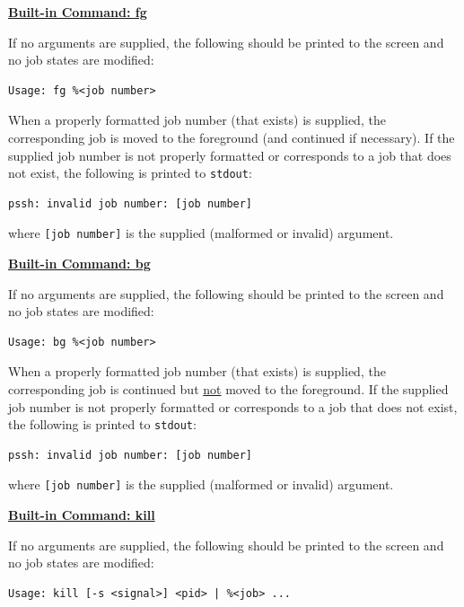 \documentclass[10pt]{article}
\begin{document}
\textbf{\underline{Built-in Command: fg}}

If no arguments are supplied, the following should be printed to the
screen and no job states are modified:

\begin{verbatim}
Usage: fg %<job number>
\end{verbatim}

When a properly formatted job number (that exists) is supplied, the
corresponding job is moved to the foreground (and continued if
necessary).  If the supplied job number is not properly formatted or
corresponds to a job that does not exist, the following is printed to
\texttt{stdout}:

\begin{verbatim}
pssh: invalid job number: [job number]
\end{verbatim}
where \texttt{[job number]} is the supplied (malformed or invalid) argument.

\pagebreak

\textbf{\underline{Built-in Command: bg}}

If no arguments are supplied, the following should be printed to the
screen and no job states are modified:

\begin{verbatim}
Usage: bg %<job number>
\end{verbatim}

When a properly formatted job number (that exists) is supplied, the
corresponding job is continued but \underline{not} moved to the
foreground.  If the supplied job number is not properly formatted or
corresponds to a job that does not exist, the following is printed to
\texttt{stdout}:

\begin{verbatim}
pssh: invalid job number: [job number]
\end{verbatim}
where \texttt{[job number]} is the supplied (malformed or invalid) argument.


\vspace{12pt}
\textbf{\underline{Built-in Command: kill}}

If no arguments are supplied, the following should be printed to the
screen and no job states are modified:

\begin{verbatim}
Usage: kill [-s <signal>] <pid> | %<job> ...
\end{verbatim}
\end{document}
